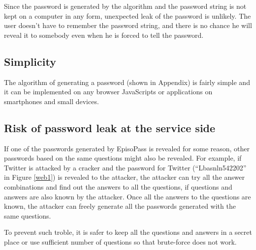 \documentclass[runningheads,a4paper]{llncs}
\begin{document}
Since the password is generated by the algorithm and the password
string is not kept on a computer in any form,
unexpected leak of the password is unlikely.
The user doesn't have to remember the password string, and
there is no chance he will reveal it to somebody
even when he is forced to tell the password.


\subsection{Simplicity}

The algorithm of generating a password (shown in Appendix)
is fairly simple and
it can be implemented on any browser JavaScripts or
applications on smartphones and small devices.

\subsection{Risk of password leak at the service side}

If one of the passwords generated by EpisoPass is revealed
for some reason, other passwords based on the same questions
might also be revealed.
%
For example, if Twitter is attacked by a cracker and
the password for Twitter (``\textsf{Lbasnln542202}'' in Figure \ref{web1})
is revealed to the attacker,
the attacker can try all the answer combinations and find out
the answers to all the questions,
if questions and answers are also known by the attacker.
Once all the answers to the questions are known,
the attacker can freely generate all the passwords
generated with the same questions.

To prevent such troble, it is safer to keep all the questions and answers
in a secret place or
use sufficient number of questions so that brute-force does not work.

% 
%
\end{document}
